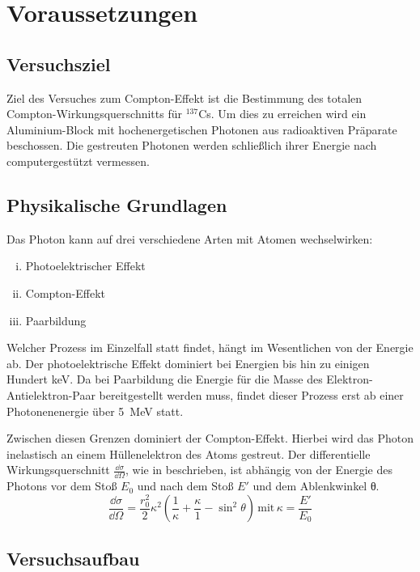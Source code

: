 \section{Voraussetzungen}

\subsection{Versuchsziel}

Ziel des Versuches zum Compton-Effekt ist die Bestimmung des totalen
Compton-Wirkungsquerschnitts für $^{137}$Cs. Um dies zu erreichen wird ein
Aluminium-Block mit hochenergetischen Photonen aus radioaktiven Präparate
beschossen. Die gestreuten Photonen werden schließlich ihrer Energie nach
computergestützt vermessen.

\subsection{Physikalische Grundlagen}

Das Photon kann auf drei verschiedene Arten mit Atomen wechselwirken:
\begin{enumerate}[i)]
  \item Photoelektrischer Effekt
  \item Compton-Effekt
  \item Paarbildung
\end{enumerate}
Welcher Prozess im Einzelfall statt findet, hängt im Wesentlichen von der
Energie ab. Der photoelektrische Effekt dominiert bei Energien bis hin zu
einigen Hundert \si{\kilo\eV}. Da bei Paarbildung die Energie für die Masse des
Elektron-Antielektron-Paar bereitgestellt werden muss, findet dieser Prozess
erst ab einer Photonenenergie über \SI{5}{\mega\eV} statt.

Zwischen diesen Grenzen dominiert der Compton-Effekt. Hierbei wird das Photon
inelastisch an einem Hüllenelektron des Atoms gestreut. Der differentielle
Wirkungsquerschnitt $\frac{\dd{σ}}{\dd{\Omega}}$, wie in \cite[Gl. 1]{script}
beschrieben, ist abhängig von der Energie des Photons vor dem Stoß $E_0$ und
nach dem Stoß $E'$ und dem Ablenkwinkel θ.
\begin{equation}
  \frac{\dd{σ}}{\dd{\Omega}} = \frac{r_0^2}{2}κ^2\left(\frac{1}{κ}+\frac{κ}{1}-\sin^2\theta\right)
  \,
  \mathrm{mit}
  \,
  κ = \frac{E'}{E_0}
  \label{eqn:diff_sigma}
\end{equation}

\subsection{Versuchsaufbau}

